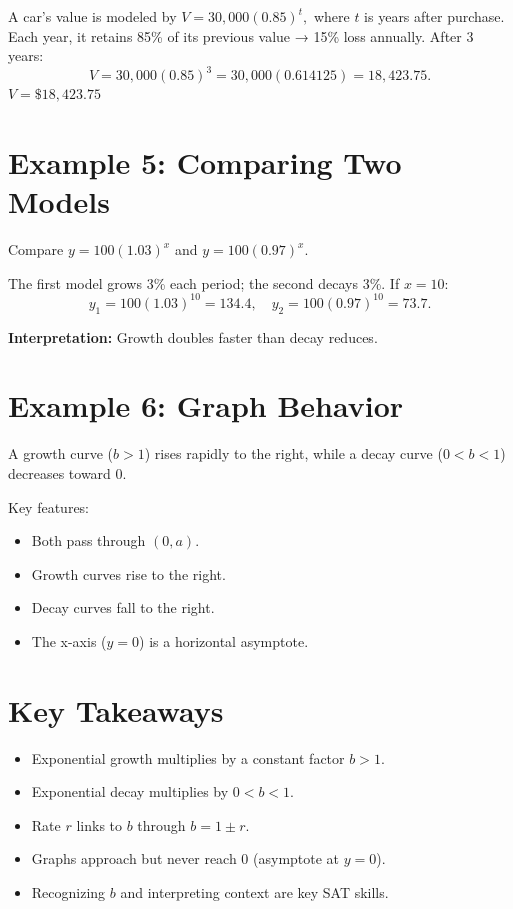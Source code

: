 \documentclass[14pt]{extarticle}
\begin{document}
A car’s value is modeled by \(V = 30{,}000(0.85)^t,\) where \(t\) is years after purchase.  
Each year, it retains 85\% of its previous value → 15\% loss annually.
After 3 years:
\[
V = 30{,}000(0.85)^3 = 30{,}000(0.614125) = 18{,}423.75.
\]
\(\boxed{V = \$18{,}423.75}\)

\section*{Example 5: Comparing Two Models}

Compare \(y = 100(1.03)^x\) and \(y = 100(0.97)^x.\)

The first model grows 3\% each period; the second decays 3\%.
If \(x = 10\):
\[
y_1 = 100(1.03)^{10} = 134.4, \quad y_2 = 100(0.97)^{10} = 73.7.
\]

\textbf{Interpretation:} Growth doubles faster than decay reduces.

\section*{Example 6: Graph Behavior}

A growth curve (\(b > 1\)) rises rapidly to the right, while a decay curve (\(0 < b < 1\)) decreases toward 0.

Key features:
\begin{itemize}
  \item Both pass through \((0, a)\).
  \item Growth curves rise to the right.
  \item Decay curves fall to the right.
  \item The x-axis (\(y = 0\)) is a horizontal asymptote.
\end{itemize}

\section*{Key Takeaways}
\begin{itemize}
  \item Exponential growth multiplies by a constant factor \(b > 1\).
  \item Exponential decay multiplies by \(0 < b < 1\).
  \item Rate \(r\) links to \(b\) through \(b = 1 \pm r.\)
  \item Graphs approach but never reach 0 (asymptote at \(y = 0\)).
  \item Recognizing \(b\) and interpreting context are key SAT skills.
\end{itemize}
\end{document}
